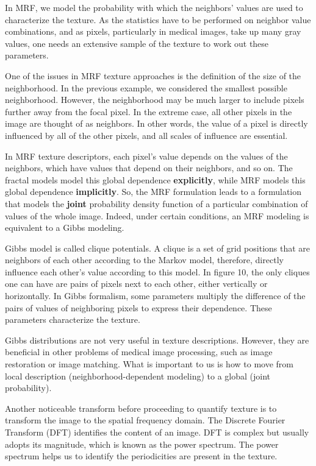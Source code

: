 In MRF, we model the probability with which the neighbors' values are used to characterize the texture. As the statistics have to be performed on neighbor value combinations, and as pixels, particularly in medical images, take up many gray values, one needs an extensive sample of the texture to work out these parameters.

One of the issues in MRF texture approaches is the definition of the size of the neighborhood. In the previous example, we considered the smallest possible neighborhood. However, the neighborhood may be much larger to include pixels further away from the focal pixel. In the extreme case, all other pixels in the image are thought of as neighbors. In other words, the value of a pixel is directly influenced by all of the other pixels, and all scales of influence are essential.

In MRF texture descriptors, each pixel's value depends on the values of the neighbors, which have values that depend on their neighbors, and so on. The fractal models model this global dependence \textbf{explicitly}, while MRF models this global dependence \textbf{implicitly}. So, the MRF formulation leads to a formulation that models the \textbf{joint} probability density function of a particular combination of values of the whole image. Indeed, under certain conditions, an MRF modeling is equivalent to a Gibbs modeling.

Gibbs model is called clique potentials. A clique is a set of grid positions that are neighbors of each other according to the Markov model, therefore, directly influence each other’s value according to this model. In figure 10, the only cliques one can have are pairs of pixels next to each other, either vertically or horizontally. In Gibbs formalism, some parameters multiply the difference of the pairs of values of neighboring pixels to express their dependence. These parameters characterize the texture.

Gibbs distributions are not very useful in texture descriptions. However, they are beneficial in other problems of medical image processing, such as image restoration or image matching. What is important to us is how to move from local description (neighborhood-dependent modeling) to a global (joint probability).

Another noticeable transform before proceeding to quantify texture is to transform the image to the spatial frequency domain. The Discrete Fourier Transform (DFT) identifies the content of an image. DFT is complex but usually adopts its magnitude, which is known as the power spectrum. The power spectrum helps us to identify the periodicities are present in the texture.  

